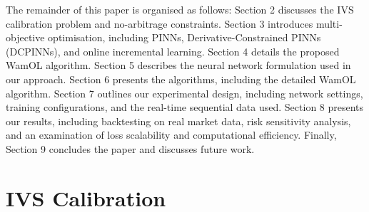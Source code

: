\documentclass[sigconf, authorversion=true, nonacm=true]{acmart}
\begin{document}
The remainder of this paper is organised as follows: Section 2 discusses the IVS calibration problem and no-arbitrage constraints. Section 3 introduces multi-objective optimisation, including PINNs, Derivative-Constrained PINNs (DCPINNs), and online incremental learning. Section 4 details the proposed WamOL algorithm. Section 5 describes the neural network formulation used in our approach. Section 6 presents the algorithms, including the detailed WamOL algorithm. Section 7 outlines our experimental design, including network settings, training configurations, and the real-time sequential data used. Section 8 presents our results, including backtesting on real market data, risk sensitivity analysis, and an examination of loss scalability and computational efficiency. Finally, Section 9 concludes the paper and discusses future work.

\section{IVS Calibration}
\end{document}
